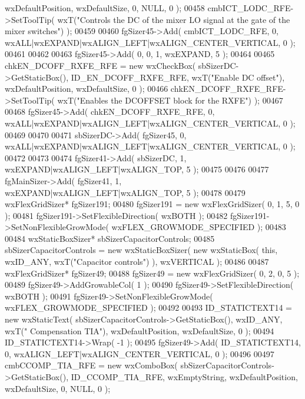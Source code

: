 \begin{DoxyCode}
      wxDefaultPosition, wxDefaultSize, 0, NULL, 0 ); 
00458     cmbICT_LODC_RFE->SetToolTip( wxT(\textcolor{stringliteral}{"Controls the DC of the mixer LO signal at the gate of the mixer
       switches"}) );
00459     
00460     fgSizer45->Add( cmbICT_LODC_RFE, 0, wxALL|wxEXPAND|wxALIGN\_LEFT|wxALIGN\_CENTER\_VERTICAL, 0 );
00461     
00462     
00463     fgSizer45->Add( 0, 0, 1, wxEXPAND, 5 );
00464     
00465     chkEN_DCOFF_RXFE_RFE = \textcolor{keyword}{new} wxCheckBox( sbSizerDC->GetStaticBox(), 
      ID_EN_DCOFF_RXFE_RFE, wxT(\textcolor{stringliteral}{"Enable DC offset"}), wxDefaultPosition, wxDefaultSize, 0 );
00466     chkEN_DCOFF_RXFE_RFE->SetToolTip( wxT(\textcolor{stringliteral}{"Enables the DCOFFSET block for the RXFE"}) );
00467     
00468     fgSizer45->Add( chkEN_DCOFF_RXFE_RFE, 0, wxALL|wxEXPAND|wxALIGN\_LEFT|wxALIGN\_CENTER\_VERTICAL, 0 );
00469     
00470     
00471     sbSizerDC->Add( fgSizer45, 0, wxALL|wxEXPAND|wxALIGN\_LEFT|wxALIGN\_CENTER\_VERTICAL, 0 );
00472     
00473     
00474     fgSizer41->Add( sbSizerDC, 1, wxEXPAND|wxALIGN\_LEFT|wxALIGN\_TOP, 5 );
00475     
00476     
00477     fgMainSizer->Add( fgSizer41, 1, wxEXPAND|wxALIGN\_LEFT|wxALIGN\_TOP, 5 );
00478     
00479     wxFlexGridSizer* fgSizer191;
00480     fgSizer191 = \textcolor{keyword}{new} wxFlexGridSizer( 0, 1, 5, 0 );
00481     fgSizer191->SetFlexibleDirection( wxBOTH );
00482     fgSizer191->SetNonFlexibleGrowMode( wxFLEX\_GROWMODE\_SPECIFIED );
00483     
00484     wxStaticBoxSizer* sbSizerCapacitorControls;
00485     sbSizerCapacitorControls = \textcolor{keyword}{new} wxStaticBoxSizer( \textcolor{keyword}{new} wxStaticBox( \textcolor{keyword}{this}, wxID\_ANY, wxT(\textcolor{stringliteral}{"Capacitor
       controls"}) ), wxVERTICAL );
00486     
00487     wxFlexGridSizer* fgSizer49;
00488     fgSizer49 = \textcolor{keyword}{new} wxFlexGridSizer( 0, 2, 0, 5 );
00489     fgSizer49->AddGrowableCol( 1 );
00490     fgSizer49->SetFlexibleDirection( wxBOTH );
00491     fgSizer49->SetNonFlexibleGrowMode( wxFLEX\_GROWMODE\_SPECIFIED );
00492     
00493     ID_STATICTEXT14 = \textcolor{keyword}{new} wxStaticText( sbSizerCapacitorControls->GetStaticBox(), wxID\_ANY, wxT(\textcolor{stringliteral}{"
      Compensation TIA"}), wxDefaultPosition, wxDefaultSize, 0 );
00494     ID_STATICTEXT14->Wrap( -1 );
00495     fgSizer49->Add( ID_STATICTEXT14, 0, wxALIGN\_LEFT|wxALIGN\_CENTER\_VERTICAL, 0 );
00496     
00497     cmbCCOMP_TIA_RFE = \textcolor{keyword}{new} wxComboBox( sbSizerCapacitorControls->GetStaticBox(), 
      ID_CCOMP_TIA_RFE, wxEmptyString, wxDefaultPosition, wxDefaultSize, 0, NULL, 0 ); 

\end{DoxyCode}
